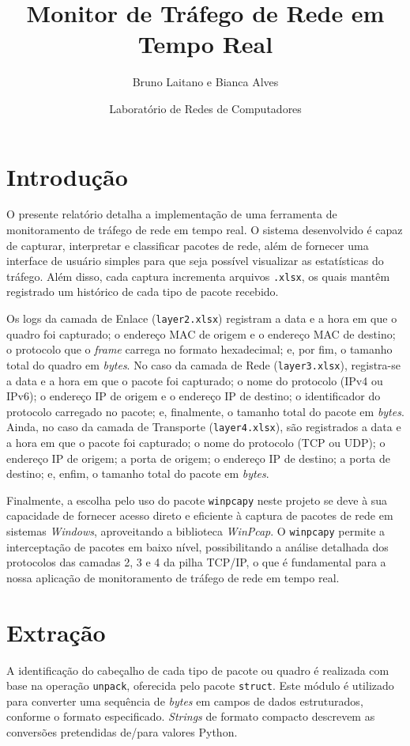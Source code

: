 \documentclass[12pt]{article}
\title{\textbf{Monitor de Tráfego de Rede em Tempo Real}}
\date{Laboratório de Redes de Computadores}
\author{Bruno Laitano e Bianca Alves}
\begin{document}
\maketitle

\section{Introdução}
O presente relatório detalha a implementação de uma ferramenta de monitoramento de tráfego de rede em tempo real. O sistema desenvolvido é capaz de capturar, interpretar e classificar pacotes de rede, além de fornecer uma interface de usuário simples para que seja possível visualizar as estatísticas do tráfego. Além disso, cada captura incrementa arquivos \texttt{.xlsx}, os quais mantêm registrado um histórico de cada tipo de pacote recebido.

\quad Os logs da camada de Enlace (\texttt{layer2.xlsx}) registram a data e a hora em que o quadro foi capturado; o endereço MAC de origem e o endereço MAC de destino; o protocolo que o \emph{frame} carrega no formato hexadecimal; e, por fim, o tamanho total do quadro em \emph{bytes}. No caso da camada de Rede (\texttt{layer3.xlsx}), registra-se a data e a hora em que o pacote foi capturado; o nome do protocolo (IPv4 ou IPv6); o endereço IP de origem e o endereço IP de destino; o identificador do protocolo carregado no pacote; e, finalmente, o tamanho total do pacote em \emph{bytes}. Ainda, no caso da camada de Transporte (\texttt{layer4.xlsx}), são registrados a data e a hora em que o pacote foi capturado; o nome do protocolo (TCP ou UDP); o endereço IP de origem; a porta de origem; o endereço IP de destino; a porta de destino; e, enfim, o tamanho total do pacote em \emph{bytes}.

\quad Finalmente, a escolha pelo uso do pacote \texttt{winpcapy} neste projeto se deve à sua capacidade de fornecer acesso direto e eficiente à captura de pacotes de rede em sistemas \emph{Windows}, aproveitando a biblioteca \emph{WinPcap}. O \texttt{winpcapy} permite a interceptação de pacotes em baixo nível, possibilitando a análise detalhada dos protocolos das camadas 2, 3 e 4 da pilha TCP/IP, o que é fundamental para a nossa aplicação de monitoramento de tráfego de rede em tempo real.

\section{Extração}
A identificação do cabeçalho de cada tipo de pacote ou quadro é realizada com base na operação \texttt{unpack}, oferecida pelo pacote \texttt{struct}. Este módulo é utilizado para converter uma sequência de \emph{bytes} em campos de dados estruturados, conforme o formato especificado. \emph{Strings} de formato compacto descrevem as conversões pretendidas de/para valores Python.
\end{document}

